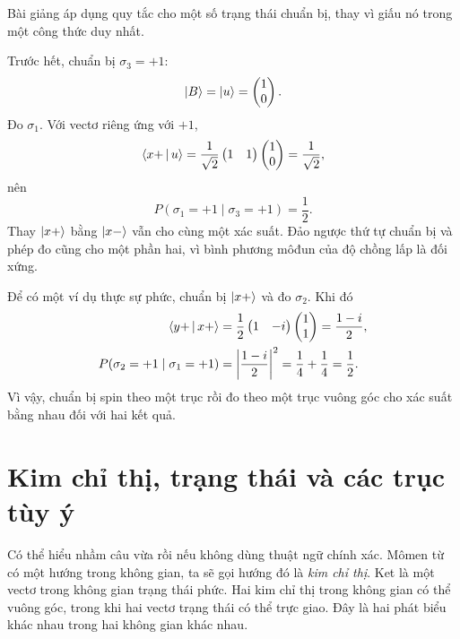 Bài giảng áp dụng quy tắc cho một số trạng thái chuẩn bị, thay vì giấu nó trong một công thức duy nhất.

Trước hết, chuẩn bị \(\sigma_3=+1\):
\begin{equation}
  \left\lvert B\right\rangle=\left\lvert u\right\rangle=\begin{pmatrix}1\\0\end{pmatrix}.
\end{equation}
Đo \(\sigma_1\). Với vectơ riêng ứng với \(+1\),
\begin{equation}
  \left\langle x+\,\middle|\,u\right\rangle
  =
  \frac{1}{\sqrt2}
  \begin{pmatrix}1&1\end{pmatrix}
  \begin{pmatrix}1\\0\end{pmatrix}
  =\frac{1}{\sqrt2},
\end{equation}
nên
\begin{equation}
  P(\sigma_1=+1\mid\sigma_3=+1)=\frac12.
\end{equation}
Thay \(\left\lvert x+\right\rangle\) bằng \(\left\lvert x-\right\rangle\) vẫn cho cùng một xác suất. Đảo ngược thứ tự chuẩn bị và phép đo cũng cho một phần hai, vì bình phương môđun của độ chồng lấp là đối xứng.

Để có một ví dụ thực sự phức, chuẩn bị \(\left\lvert x+\right\rangle\) và đo \(\sigma_2\). Khi đó
\begin{align}
  \left\langle y+\,\middle|\,x+\right\rangle
  &=
  \frac12
  \begin{pmatrix}1&-i\end{pmatrix}
  \begin{pmatrix}1\\1\end{pmatrix}
  =\frac{1-i}{2},
  \notag\\
  P(\sigma_2=+1\mid\sigma_1=+1)
  &=\left|\frac{1-i}{2}\right|^2
  =\frac14+\frac14
  =\frac12.
  \label{eq:l03-complex-probability-example}
\end{align}
Vì vậy, chuẩn bị spin theo một trục rồi đo theo một trục vuông góc cho xác suất bằng nhau đối với hai kết quả.

\section{Kim chỉ thị, trạng thái và các trục tùy ý}

Có thể hiểu nhầm câu vừa rồi nếu không dùng thuật ngữ chính xác. Mômen từ có một hướng trong không gian, ta sẽ gọi hướng đó là \emph{kim chỉ thị}. Ket là một vectơ trong không gian trạng thái phức. Hai kim chỉ thị trong không gian có thể vuông góc, trong khi hai vectơ trạng thái có thể trực giao. Đây là hai phát biểu khác nhau trong hai không gian khác nhau.

